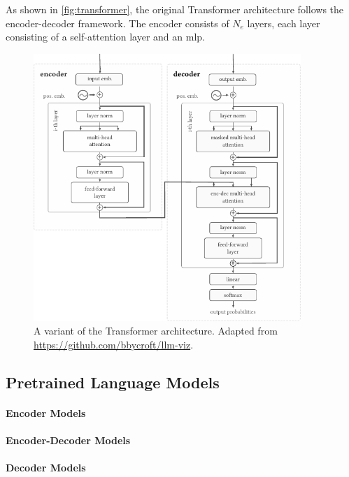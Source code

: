 As shown in \autoref{fig:transformer}, the original Transformer architecture follows the encoder-decoder framework. The encoder consists of $N_e$ layers, each layer consisting of a self-attention layer and an \ac{mlp}.

\begin{figure}[h]
    \centering
    \includegraphics[width=0.9\textwidth]{img/transformer.pdf}
    \caption{A variant of the Transformer architecture. Adapted from \href{https://github.com/bbycroft/llm-viz/blob/main/src/llm/intro-image.svg}{https://github.com/bbycroft/llm-viz}.}
    \label{fig:transformer}
\end{figure}


\subsection{Pretrained Language Models}
\label{sec:plms}

\paragraph{Encoder Models}

\paragraph{Encoder-Decoder Models}

\paragraph{Decoder Models}

